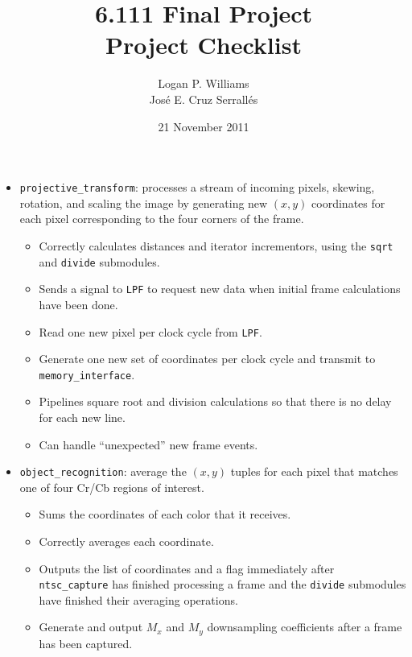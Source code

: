 \documentclass{article}
\title{6.111 Final Project\\Project Checklist}
\date{21 November 2011}
\author{Logan P. Williams\\Jos\'{e} E. Cruz Serrall\'{e}s}
\begin{document}
\maketitle

\begin{itemize}
\item[] {\tt projective\_transform}: processes a stream of incoming pixels, skewing, rotation, and scaling the image by generating new $(x,y)$ coordinates for each pixel corresponding to the four corners of the frame.
	\begin{itemize}
	\item Correctly calculates distances and iterator incrementors, using the {\tt sqrt} and {\tt divide} submodules. 
	\item Sends a signal to {\tt LPF} to request new data when initial frame calculations have been done.
	\item Read one new pixel per clock cycle from {\tt LPF}.
	\item Generate one new set of coordinates per clock cycle and transmit to {\tt memory\_interface}.
	\item Pipelines square root and division calculations so that there is no delay for each new line.
	\item Can handle ``unexpected'' new frame events.
	\end{itemize}

\item[] {\tt object\_recognition}: average the $(x,y)$ tuples for each pixel that matches one of four Cr/Cb regions of interest.
	\begin{itemize}
	\item Sums the coordinates of each color that it receives.
	\item Correctly averages each coordinate.
	\item Outputs the list of coordinates and a flag immediately after {\tt ntsc\_capture} has finished processing a frame and the {\tt divide} submodules have finished their averaging operations.
	\item Generate and output $M_x$ and $M_y$ downsampling coefficients after a frame has been captured.
	\end{itemize}


\end{itemize}
\end{document}
